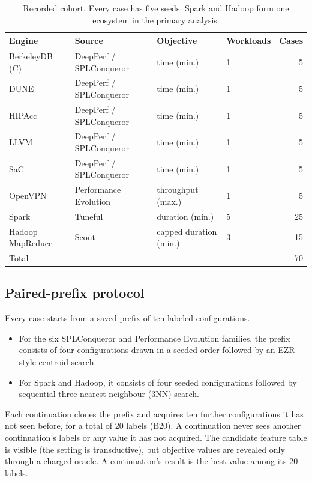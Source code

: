 \begin{table}[t]
\centering
\caption{Recorded cohort. Every case has five seeds. Spark and Hadoop form one ecosystem in the primary analysis.}
\label{tab:cohort}
\small
\begin{tabular}{llllr}
\toprule
Engine & Source & Objective & Workloads & Cases \\
\midrule
BerkeleyDB (C) & DeepPerf / SPLConqueror & time (min.) & 1 & 5 \\
DUNE & DeepPerf / SPLConqueror & time (min.) & 1 & 5 \\
HIPAcc & DeepPerf / SPLConqueror & time (min.) & 1 & 5 \\
LLVM & DeepPerf / SPLConqueror & time (min.) & 1 & 5 \\
SaC & DeepPerf / SPLConqueror & time (min.) & 1 & 5 \\
OpenVPN & Performance Evolution & throughput (max.) & 1 & 5 \\
Spark & Tuneful & duration (min.) & 5 & 25 \\
Hadoop MapReduce & Scout & capped duration (min.) & 3 & 15 \\
\midrule
Total & & & & 70 \\
\bottomrule
\end{tabular}
\end{table}

\subsection{Paired-prefix protocol}

Every case starts from a saved prefix of ten labeled configurations.
\begin{itemize}
  \item For the six SPLConqueror and Performance Evolution families, the prefix consists of four configurations drawn in a seeded order followed by an EZR-style centroid search.
  \item For Spark and Hadoop, it consists of four seeded configurations followed by sequential three-nearest-neighbour (3NN) search.
\end{itemize}
Each continuation clones the prefix and acquires ten further configurations it has not seen before, for a total of 20 labels (B20). A continuation never sees another continuation's labels or any value it has not acquired. The candidate feature table is visible (the setting is transductive), but objective values are revealed only through a charged oracle. A continuation's result is the best value among its 20 labels.

